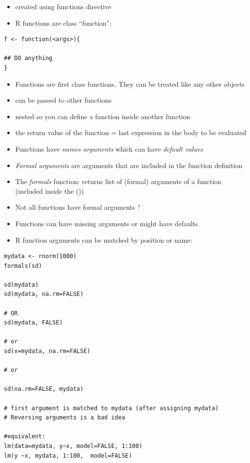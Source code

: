 \documentclass[11pt]{article}
\begin{document}
\begin{itemize}
\item created using functions directive
\item R functions are class ``function'':
\end{itemize}

\begin{verbatim}
f <- function(<args>){

## DO anything
}
\end{verbatim}

\begin{itemize}
\item Functions are first class functions. They can be treated like
  any other objects
\item can be passed to other functions
\item nested so you can define a function inside another function
\item the return value of the function = last expression in the body to
  be evaluated
\item Functions have \emph{names arguments} which can have \emph{default values}
\item \emph{Formal arguments} are arguments that are included in the function
  definition
\item The \emph{formals} function: returns list of (formal) arguments of a
  function (included inside the ())
\item Not all functions have formal arguments ?
\item Functions can have missing arguments or might have defaults
\item R function arguments can be matched by position or name:
\end{itemize}

\begin{verbatim}
mydata <- rnorm(1000)
formals(sd)

sd(mydata)
sd(mydata, na.rm=FALSE)

# OR
sd(mydata, FALSE)

# or
sd(x=mydata, na.rm=FALSE)

# or

sd(na.rm=FALSE, mydata)

# first argument is matched to mydata (after assigning mydata)
# Reversing arguments is a bad idea

#equivalent:
lm(data=mydata, y~x, model=FALSE, 1:100)
lm(y ~x, mydata, 1:100,  model=FALSE)
\end{verbatim}
\end{document}
